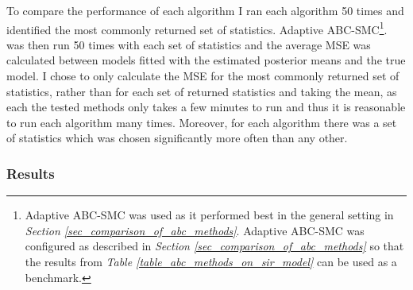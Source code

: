 \documentclass[11pt,a4paper]{article}
\theoremstyle{break}
\begin{document}
  \par To compare the performance of each algorithm I ran each algorithm 50 times and identified the most commonly returned set of statistics. Adaptive ABC-SMC\footnote{Adaptive ABC-SMC was used as it performed best in the general setting in \textit{Section \ref{sec_comparison_of_abc_methods}}. Adaptive ABC-SMC was configured as described in \textit{Section \ref{sec_comparison_of_abc_methods}} so that the results from \textit{Table \ref{table_abc_methods_on_sir_model}} can be used as a benchmark.}. was then run 50 times with each set of statistics and the average MSE was calculated between models fitted with the estimated posterior means and the true model. I chose to only calculate the MSE for the most commonly returned set of statistics, rather than for each set of returned statistics and taking the mean, as each the tested methods only takes a few minutes to run and thus it is reasonable to run each algorithm many times. Moreover, for each algorithm there was a set of statistics which was chosen significantly more often than any other.

\subsubsection*{Results}
\end{document}
